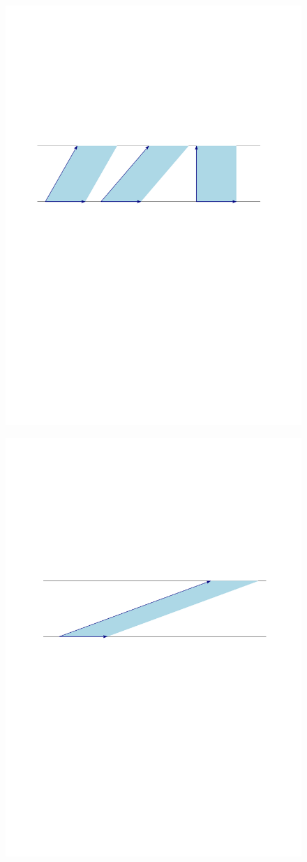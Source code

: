 \documentclass[a4paper, 12pt, brazilian]{article}
\begin{document}
	\begin{figure}[H]
		\centering
		\includegraphics[width=.95\linewidth]{images/area}
		\label{fig:area}
	\end{figure}
	\begin{figure}[H]
		\centering
		\includegraphics[width=.95\linewidth]{images/area_n}
		\label{fig:arean}
	\end{figure}
	
	
	
\end{document}
